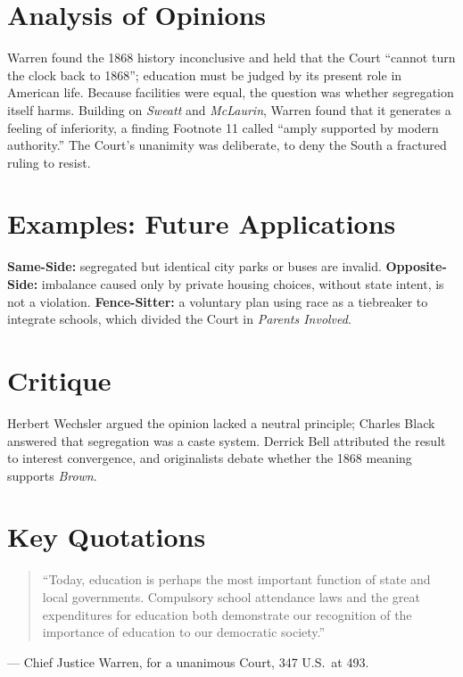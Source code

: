 \documentclass[12pt]{article}
\begin{document}
\section{Analysis of Opinions}
Warren found the 1868 history inconclusive and held that the Court ``cannot turn the clock back to 1868''; education must be judged by its present role in American life. Because facilities were equal, the question was whether segregation itself harms. Building on \textit{Sweatt} and \textit{McLaurin}, Warren found that it generates a feeling of inferiority, a finding Footnote 11 called ``amply supported by modern authority.'' The Court's unanimity was deliberate, to deny the South a fractured ruling to resist.

\section{Examples: Future Applications}
\textbf{Same-Side:} segregated but identical city parks or buses are invalid. \textbf{Opposite-Side:} imbalance caused only by private housing choices, without state intent, is not a violation. \textbf{Fence-Sitter:} a voluntary plan using race as a tiebreaker to integrate schools, which divided the Court in \textit{Parents Involved}.

\section{Critique}
Herbert Wechsler argued the opinion lacked a neutral principle; Charles Black answered that segregation was a caste system. Derrick Bell attributed the result to interest convergence, and originalists debate whether the 1868 meaning supports \textit{Brown}.

\section{Key Quotations}
\begin{quote}
``Today, education is perhaps the most important function of state and local governments. Compulsory school attendance laws and the great expenditures for education both demonstrate our recognition of the importance of education to our democratic society.''
\end{quote}
\noindent --- Chief Justice Warren, for a unanimous Court, 347 U.S.\ at 493.
\end{document}
